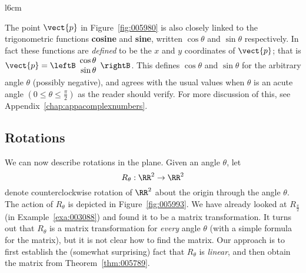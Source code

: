 \begin{wrapfigure}[7]{l}{6cm} 
\centering

\caption{\label{fig:005980}}
\end{wrapfigure}

The point $\vect{p}$ in Figure~\ref{fig:005980} is also closely linked to the trigonometric functions \textbf{cosine} and \textbf{sine}, written $\cos \theta$ and $\sin \theta$ respectively. In fact these functions are \textit{defined} to be the $x$ and $y$ coordinates of $\vect{p}$; that is $\vect{p} = \leftB \begin{array}{r}
\cos \theta \\
\sin \theta
\end{array} \rightB$. 
 This defines $\cos \theta$ and $\sin \theta$ for the arbitrary angle $\theta$ (possibly negative), and agrees with the usual values when $\theta$ is an acute angle $\left(0 \leq \theta \leq \frac{\pi}{2}\right)$
 as the reader should verify. For more discussion of this, see Appendix~\ref{chap:appacomplexnumbers}.

\medskip

\subsection*{Rotations}

We can now describe rotations in the plane. Given an angle $\theta$, let
\begin{equation*}
R_{\theta} : \RR^2 \to \RR^2
\end{equation*}
denote counterclockwise rotation of $\RR^2$ about the origin through the angle $\theta$. The action of $R_{\theta}$ is depicted in Figure~\ref{fig:005993}. We have already looked at $R_{\frac{\pi}{2}}$ (in Example~\ref{exa:003088}) and found it to be a matrix transformation. It turns out that $R_{\theta}$ is a matrix transformation for \textit{every} angle $\theta$ (with a simple formula for the matrix), but it is not clear how to find the matrix. Our approach is to first establish the (somewhat surprising) fact that $R_{\theta}$ is \textit{linear}, and then obtain the matrix from Theorem~\ref{thm:005789}.


\begin{figure}[H]
\begin{minipage}{0.45\textwidth}
\centering

\caption{\label{fig:005993}}
\end{minipage}
\begin{minipage}{0.45\textwidth}
\centering

\caption{\label{fig:006003}}
\end{minipage}
\end{figure}

